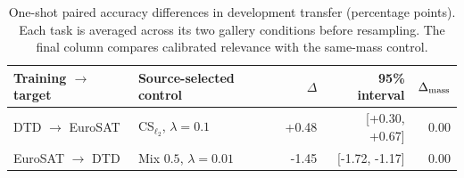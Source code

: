 \begin{table}[ht]
\centering
\caption{One-shot paired accuracy differences in development transfer (percentage points). Each task is averaged across its two gallery conditions before resampling. The final column compares calibrated relevance with the same-mass control.}\label{tab:calibration-deltas}
\small\setlength{\tabcolsep}{4pt}
\begin{tabular}{llrrr}\toprule
Training $\to$ target & Source-selected control & $\Delta$ & 95\% interval & $\Delta_{\rm mass}$\\\midrule
DTD $\to$ EuroSAT & CS$_{\ell_2}$, $\lambda=0.1$ & +0.48 & [+0.30, +0.67] & 0.00 \\
EuroSAT $\to$ DTD & Mix $0.5$, $\lambda=0.01$ & -1.45 & [-1.72, -1.17] & 0.00 \\
\bottomrule\end{tabular}
\end{table}
